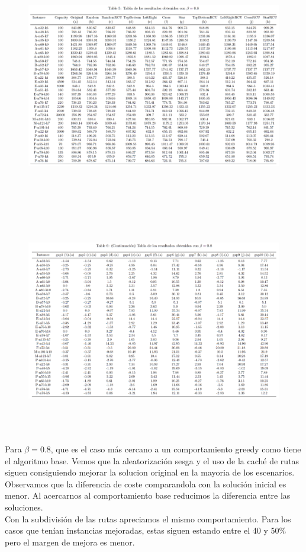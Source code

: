 \documentclass[11pt]{article} %
\begin{document}
\begin{enumerate}
\begin{figure}[H]
\centering
\includegraphics[width=\linewidth, height=10cm]{table081.png} 
\end{figure}
\begin{figure}[H]
\includegraphics[width=\linewidth, height=10cm]{table082.png} 
\label{fig:subim1}
\end{figure}

Para $\beta = 0.8$, que es el caso más cercano a un comportamiento greedy como tiene el algoritmo base. Vemos que la aleatorización sesga y el uso de la caché de rutas siguen consiguiendo mejorar la solucion original en la mayoria de los escenarios. Observamos que la diferencia de coste comparandola con la solución inicial es menor. Al acercarnos al comportamiento base reducimos la diferencia entre las soluciones.\\
Con la subdivisión de las rutas apreciamos el mismo comportamiento. Para los casos que tenían instancias mejoradas, estas siguen estando entre el 40 y 50\% pero el margen de mejora es menor.


\end{enumerate}
\end{document}
